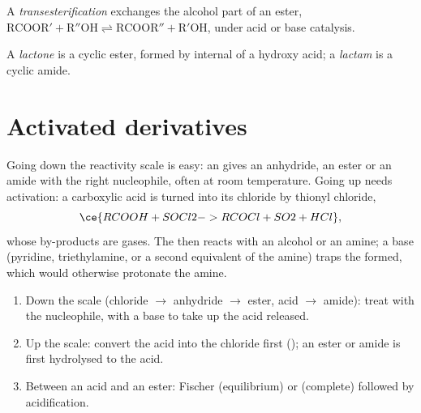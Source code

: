 \begin{definition}[Transesterification]\label{def:b2:acyl-substitution:transesterification}
A \emph{transesterification} exchanges the alcohol part of an ester,
$\mathrm{RCOOR' + R''OH \rightleftharpoons RCOOR'' + R'OH}$, under acid or base catalysis.
\end{definition}

\begin{definition}\label{def:b2:acyl-substitution:lactone}
A \emph{lactone} is a cyclic ester, formed by internal  of a
hydroxy acid; a \emph{lactam} is a cyclic amide.
\end{definition}

\section{Activated derivatives}

Going down the reactivity scale is easy: an  gives an anhydride, an ester or an
amide with the right nucleophile, often at room temperature. Going up needs activation: a
carboxylic acid is turned into its chloride by thionyl chloride,
\[
  \ce{RCOOH + SOCl2 -> RCOCl + SO2 + HCl} ,
\]
whose by-products are gases. The  then reacts with an alcohol or an amine; a base
(pyridine, triethylamine, or a second equivalent of the amine) traps the  formed, which
would otherwise protonate the amine.

\begin{method}\label{met:b2:acyl-substitution:ladder}
\begin{enumerate}
  \item Down the scale (chloride $\to$ anhydride $\to$ ester, acid $\to$ amide): treat with the
        nucleophile, with a base to take up the acid released.
  \item Up the scale: convert the acid into the chloride first (); an ester or amide is
        first hydrolysed to the acid.
  \item Between an acid and an ester: Fischer  (equilibrium) or 
        (complete) followed by acidification.
\end{enumerate}
\end{method}

